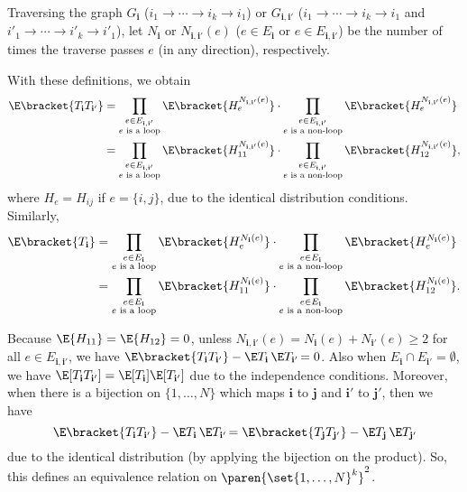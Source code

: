 \documentclass{homework}
\begin{document}
{Traversing the graph $G_{\mathbf i}$ ($i_1\to \cdots \to i_k \to i_1$) or $G_{\mathbf i,\mathbf i'}$ ($i_1\to \cdots \to i_k \to i_1$ and $i'_1\to \cdots \to i'_k \to i'_1$), let $N_{\mathbf i}$ or $N_{\mathbf i,\mathbf i'}(e)$ ($e\in E_{\mathbf i}$ or $e\in E_{\mathbf i,\mathbf i'}$) be the number of times the traverse passes $e$ (in any direction), respectively.

\setlength{\leftskip}{0cm}
With these definitions, we obtain
\begin{align*}
    \E\bracket{T_{\mathbf i}T_{\mathbf i'}} &= \prod_{\substack{e\in E_{\mathbf i,\mathbf i'} \\ \text{$e$ is a loop}}} \E\bracket{ H_e^{N_{\mathbf i,\mathbf i'} (e)} }\cdot \prod_{\substack{e\in E_{\mathbf i,\mathbf i'} \\ \text{$e$ is a non-loop}}} \E\bracket{ H_e^{N_{\mathbf i,\mathbf i'} (e)} }
    \\ &= \prod_{\substack{e\in E_{\mathbf i,\mathbf i'} \\ \text{$e$ is a loop}}} \E\bracket{ H_{11}^{N_{\mathbf i,\mathbf i'} (e)} }\cdot \prod_{\substack{e\in E_{\mathbf i,\mathbf i'} \\ \text{$e$ is a non-loop}}} \E\bracket{ H_{12}^{N_{\mathbf i,\mathbf i'} (e)} },
\end{align*}
where $H_e = H_{ij}$ if $e=\{i,j\}$, due to the identical distribution conditions. Similarly,
\begin{align*}
    \E\bracket{T_{\mathbf i}} &= \prod_{\substack{e\in E_{\mathbf i} \\ \text{$e$ is a loop}}} \E\bracket{ H_e^{N_{\mathbf i} (e)} }\cdot \prod_{\substack{e\in E_{\mathbf i} \\ \text{$e$ is a non-loop}}} \E\bracket{ H_e^{N_{\mathbf i} (e)} }
    \\ &= \prod_{\substack{e\in E_{\mathbf i} \\ \text{$e$ is a loop}}} \E\bracket{ H_{11}^{N_{\mathbf i} (e)} }\cdot \prod_{\substack{e\in E_{\mathbf i} \\ \text{$e$ is a non-loop}}} \E\bracket{ H_{12}^{N_{\mathbf i} (e)} }.
\end{align*}

Because $\E{H_{11}}=\E{H_{12}} = 0$, unless $N_{\mathbf i,\mathbf i'} (e)= N_{\mathbf i}(e) +N_{\mathbf i'}(e) \ge 2$ for all $e\in E_{\mathbf i,\mathbf i'}$, we have $\E\bracket{T_{\mathbf i}T_{\mathbf i'} } - \E T_{\mathbf i}\,\E T_{\mathbf i'\!} = 0$. Also when $E_{\mathbf i} \cap E_{\mathbf i'}= \emptyset$, we have $\E[T_{\mathbf i}T_{\mathbf i'}] = \E[T_{\mathbf i}] \E[T_{\mathbf i'}]$ due to the independence conditions. Moreover, when there is a bijection on $\{1,\dots, N\}$ which maps $\mathbf i$ to $\mathbf j$ and $\mathbf i'$ to $\mathbf j'$, then we have
$$ \E\bracket{T_{\mathbf i}T_{\mathbf i'} } - \E T_{\mathbf i}\,\E T_{\mathbf i'\!} = \E\bracket{T_{\mathbf j}T_{\mathbf j'} } - \E T_{\mathbf j}\,\E T_{\mathbf j'\!} $$
due to the identical distribution (by applying the bijection on the product). So, this defines an equivalence relation on $\paren{\set{1,\dots,N}^k}^2$.

}
\end{document}
